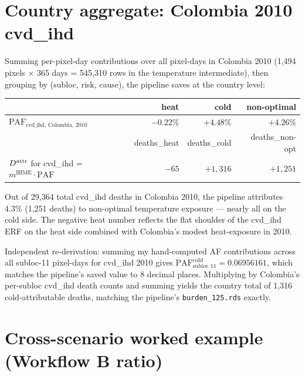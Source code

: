 \documentclass[11pt]{article}
\newcommand{\PAF}{\text{PAF}}
\newcommand{\mIHME}{m^{\text{IHME}}}
\begin{document}
\section{Country aggregate: Colombia 2010 cvd\_ihd}
\label{sec:country-agg}

Summing per-pixel-day contributions over all pixel-days in Colombia 2010
(1{,}494 pixels $\times$ 365 days = 545{,}310 rows in the temperature
intermediate), then grouping by (subloc, risk, cause), the pipeline
saves at the country level:

\begin{center}
\renewcommand{\arraystretch}{1.1}
\begin{tabular}{l r r r}
\toprule
& heat & cold & non-optimal \\
\midrule
$\PAF^{\cdot}_{\text{cvd\_ihd, Colombia, 2010}}$ & $-0.22\%$ & $+4.48\%$ & $+4.26\%$ \\
\midrule
& deaths\_heat & deaths\_cold & deaths\_non-opt \\
$\mAttr$ for cvd\_ihd = $\mIHME \cdot \PAF$ & $-65$ & $+1{,}316$ & $+1{,}251$ \\
\bottomrule
\end{tabular}
\end{center}

Out of 29{,}364 total cvd\_ihd deaths in Colombia 2010, the pipeline
attributes 4.3\% (1{,}251 deaths) to non-optimal temperature exposure ---
nearly all on the cold side. The negative heat number reflects the flat
shoulder of the cvd\_ihd ERF on the heat side combined with Colombia's
modest heat-exposure in 2010.

Independent re-derivation: summing my hand-computed AF contributions
across all subloc-11 pixel-days for cvd\_ihd 2010 gives
$\PAF^{\text{cold}}_{\text{subloc 11}} = 0.06956161$, which matches the
pipeline's saved value to 8 decimal places. Multiplying by Colombia's
per-subloc cvd\_ihd death counts and summing yields the country total of
1{,}316 cold-attributable deaths, matching the pipeline's
\texttt{burden\_125.rds} exactly.

\section{Cross-scenario worked example (Workflow B ratio)}
\label{sec:wb-example}
\end{document}
